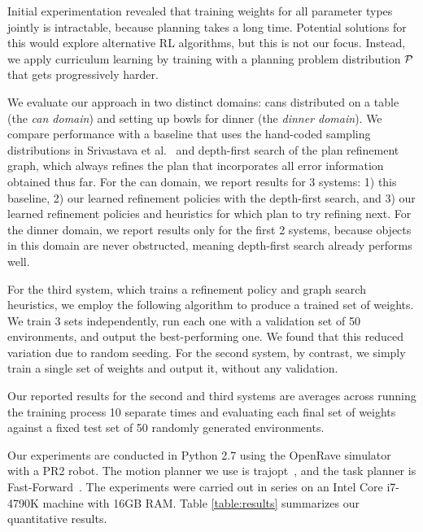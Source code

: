 Initial experimentation revealed that training weights for all parameter types jointly is intractable,
because planning takes a long time. Potential solutions for this would explore alternative RL algorithms,
but this is not our focus. Instead, we apply curriculum learning by training with a planning problem distribution
$\mathcal{P}$ that gets progressively harder.

We evaluate our approach in two distinct domains: cans distributed on a table (the \emph{can domain})
and setting up bowls for dinner (the \emph{dinner domain}).
We compare performance with a baseline that uses the hand-coded sampling distributions
in Srivastava et al.~\cite{srivastava2014combined} and depth-first search of the
plan refinement graph, which always refines the plan that incorporates all error information obtained
thus far. For the can domain, we report results for 3 systems: 1) this baseline, 2) our learned refinement policies
with the depth-first search, and 3) our learned refinement policies and heuristics for which
plan to try refining next. For the dinner domain, we report results only for the first 2 systems, because objects
in this domain are never obstructed, meaning depth-first search already performs well.

For the third system, which trains a refinement policy and graph search heuristics, we employ the following
algorithm to produce a trained set of weights. We train 3 sets independently, run each
one with a validation set of 50 environments, and output the best-performing one. We found that this
reduced variation due to random seeding. For the second system, by contrast, we simply train a single
set of weights and output it, without any validation.

Our reported results for the second and third systems are averages across running the training process 10 separate times
and evaluating each final set of weights against a fixed test set of 50 randomly generated environments.

Our experiments are conducted in Python 2.7 using the OpenRave simulator~\cite{Diankov_2008_6117} with a PR2 robot.
The motion planner we use is trajopt~\cite{schulman2013finding}, and the task planner is Fast-Forward~\cite{FF}.
The experiments were carried out in series on an Intel Core i7-4790K machine with 16GB RAM.
Table \ref{table:results} summarizes our quantitative results.

